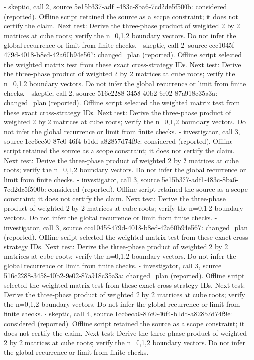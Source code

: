 \documentclass[11pt]{article}
\begin{document}
- skeptic, call 2, source 5e15b337-adf1-483c-8ba6-7cd2de5f500b: considered (reported). Offline script retained the source as a scope constraint; it does not certify the claim. Next test: Derive the three-phase product of weighted 2 by 2 matrices at cube roots; verify the n=0,1,2 boundary vectors. Do not infer the global recurrence or limit from finite checks.
- skeptic, call 2, source ccc1045f-479d-4018-b8ed-42a60b94e567: changed\_plan (reported). Offline script selected the weighted matrix test from these exact cross-strategy IDs. Next test: Derive the three-phase product of weighted 2 by 2 matrices at cube roots; verify the n=0,1,2 boundary vectors. Do not infer the global recurrence or limit from finite checks.
- skeptic, call 2, source 516c2288-3458-40b2-9e02-87a918c35a3a: changed\_plan (reported). Offline script selected the weighted matrix test from these exact cross-strategy IDs. Next test: Derive the three-phase product of weighted 2 by 2 matrices at cube roots; verify the n=0,1,2 boundary vectors. Do not infer the global recurrence or limit from finite checks.
- investigator, call 3, source 1cc6ec50-87c0-46f4-b1dd-a82857d74f9e: considered (reported). Offline script retained the source as a scope constraint; it does not certify the claim. Next test: Derive the three-phase product of weighted 2 by 2 matrices at cube roots; verify the n=0,1,2 boundary vectors. Do not infer the global recurrence or limit from finite checks.
- investigator, call 3, source 5e15b337-adf1-483c-8ba6-7cd2de5f500b: considered (reported). Offline script retained the source as a scope constraint; it does not certify the claim. Next test: Derive the three-phase product of weighted 2 by 2 matrices at cube roots; verify the n=0,1,2 boundary vectors. Do not infer the global recurrence or limit from finite checks.
- investigator, call 3, source ccc1045f-479d-4018-b8ed-42a60b94e567: changed\_plan (reported). Offline script selected the weighted matrix test from these exact cross-strategy IDs. Next test: Derive the three-phase product of weighted 2 by 2 matrices at cube roots; verify the n=0,1,2 boundary vectors. Do not infer the global recurrence or limit from finite checks.
- investigator, call 3, source 516c2288-3458-40b2-9e02-87a918c35a3a: changed\_plan (reported). Offline script selected the weighted matrix test from these exact cross-strategy IDs. Next test: Derive the three-phase product of weighted 2 by 2 matrices at cube roots; verify the n=0,1,2 boundary vectors. Do not infer the global recurrence or limit from finite checks.
- skeptic, call 4, source 1cc6ec50-87c0-46f4-b1dd-a82857d74f9e: considered (reported). Offline script retained the source as a scope constraint; it does not certify the claim. Next test: Derive the three-phase product of weighted 2 by 2 matrices at cube roots; verify the n=0,1,2 boundary vectors. Do not infer the global recurrence or limit from finite checks.
\end{document}
